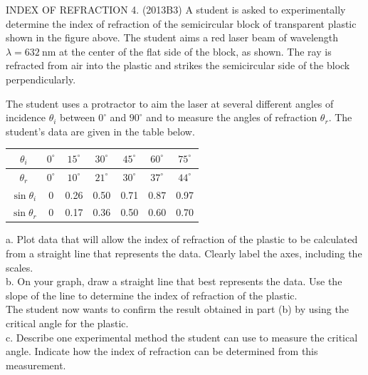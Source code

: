 \begin{enumerate}
INDEX OF REFRACTION 4. (2013B3) A student is asked to experimentally determine the index of refraction of the semicircular block of transparent plastic shown in the figure above. The student aims a red laser beam of wavelength $\lambda=632 \mathrm{~nm}$ at the center of the flat side of the block, as shown. The ray is refracted from air into the plastic and strikes the semicircular side of the block perpendicularly.

The student uses a protractor to aim the laser at several different angles of incidence $\theta_{i}$ between $0^{\circ}$ and $90^{\circ}$ and to measure the angles of refraction $\theta_{r}$. The student's data are given in the table below.

\begin{center}
\begin{tabular}{|c|c|c|c|c|c|c|}
\hline
$\theta_{i}$ & $0^{\circ}$ & $15^{\circ}$ & $30^{\circ}$ & $45^{\circ}$ & $60^{\circ}$ & $75^{\circ}$ \\
\hline
$\theta_{r}$ & $0^{\circ}$ & $10^{\circ}$ & $21^{\circ}$ & $30^{\circ}$ & $37^{\circ}$ & $44^{\circ}$ \\
\hline
$\sin \theta_{i}$ & 0 & 0.26 & 0.50 & 0.71 & 0.87 & 0.97 \\
\hline
$\sin \theta_{r}$ & 0 & 0.17 & 0.36 & 0.50 & 0.60 & 0.70 \\
\hline
\end{tabular}
\end{center}

a. Plot data that will allow the index of refraction of the plastic to be calculated from a straight line that represents the data. Clearly label the axes, including the scales.\\
b. On your graph, draw a straight line that best represents the data. Use the slope of the line to determine the index of refraction of the plastic.\\
The student now wants to confirm the result obtained in part (b) by using the critical angle for the plastic.\\
c. Describe one experimental method the student can use to measure the critical angle. Indicate how the index of refraction can be determined from this measurement.


\end{enumerate}
